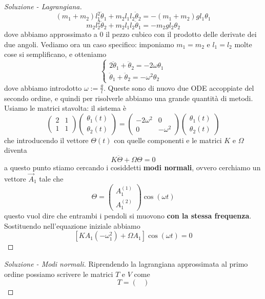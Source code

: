 \documentclass[11pt]{scrartcl}
\begin{document}
\begin{sol}
\begin{proof}[Soluzione - Lagrangiana]
			$$(m_1+m_2)l_1^2\ddot{\theta}_1+m_2l_1l_2\ddot{\theta}_2=-(m_1+m_2)gl_1\theta_1$$
			$$m_2l_2^2\ddot{\theta}_2+m_2l_1l_2\ddot{\theta}_1=-m_2gl_2\theta_2$$
			dove abbiamo approssimato a $0$ il pezzo cubico con il prodotto delle derivate dei due angoli. Vediamo ora un caso specifico: imponiamo $m_1=m_2$ e $l_1=l_2$ molte cose si semplificano, e otteniamo
			$$
			\begin{cases}
				2\ddot{\theta}_1+\ddot{\theta}_2=-2\omega \theta_1 \\
				\ddot{\theta}_1+\ddot{\theta}_2=-\omega^2 \theta_2
			\end{cases}
			$$
			dove abbiamo introdotto $\omega:=\frac{g}{l}$. Queste sono di nuovo due ODE accoppiate del secondo ordine, e quindi per risolverle abbiamo una grande quantità di metodi. Usiamo le matrici stavolta: il sistema è
			$$
			\begin{pmatrix}
				2 & 1 \\
				1 & 1
			\end{pmatrix}
			\begin{pmatrix}
				\theta_1(t) \\
				\theta_2(t)
			\end{pmatrix}
			=
			\begin{pmatrix}
				-2\omega^2 & 0 \\
				0 & -\omega^2
			\end{pmatrix}
			\begin{pmatrix}
				\theta_1(t) \\
				\theta_2(t)
			\end{pmatrix}
			$$
			che introducendo il vettore $\Theta(t)$ con quelle componenti e le matrici $K$ e $\Omega$ diventa
			$$K\ddot{\Theta}+\Omega\Theta=0$$
			a questo punto stiamo cercando i cosiddetti \textbf{modi normali}, ovvero cerchiamo un vettore $\vec{A}_1$ tale che
			$$\Theta=\begin{pmatrix}
				A_1^{(1)} \\
				A_1^{(2)}
			\end{pmatrix}\cos(\omega t)$$
			questo vuol dire che entrambi i pendoli si muovono \textbf{con la stessa frequenza}. Sostituendo nell'equazione iniziale abbiamo
			$$\left[KA_1(-\omega_1^2)+\Omega A_1\right]\cos(\omega t)=0$$
		\end{proof}
		\begin{proof}[Soluzione - Modi normali]
			Riprendendo la lagrangiana approssimata al primo ordine possiamo scrivere le matrici $T$ e $V$ come
			$$
			T=
			\begin{pmatrix}

\end{pmatrix}$$
\end{proof}
\end{sol}
\end{document}
